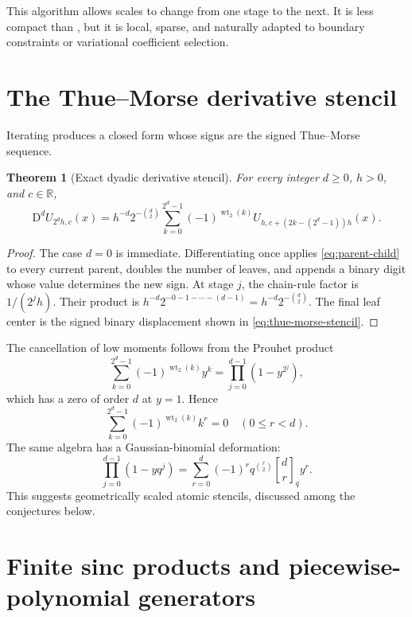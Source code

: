 \documentclass[11pt,oneside]{article}
\newtheorem{theorem}{Theorem}[section]
\theoremstyle{definition}
\theoremstyle{remark}
\newcommand{\R}{\mathbb R}
\newcommand{\wt}{\operatorname{wt}_2}
\newcommand{\D}{\mathrm D}
\newcommand{\qbinom}[3]{\genfrac{[}{]}{0pt}{}{#1}{#2}_{#3}}
\begin{document}
This algorithm allows scales to change from one stage to the next.  It is less
compact than , but it is local, sparse, and naturally adapted to
boundary constraints or variational coefficient selection.

\section{The Thue--Morse derivative stencil}
\label{sec:thue-morse}

Iterating  produces a closed form whose signs are the
signed Thue--Morse sequence.

\begin{theorem}[Exact dyadic derivative stencil]
\label{thm:thue-morse-stencil}
For every integer \(d\ge0\), \(h>0\), and \(c\in\R\),
\begin{equation}
 \boxed{\displaystyle
 \D^dU_{2^dh,c}(x)
 =h^{-d}2^{-\binom d2}
  \sum_{k=0}^{2^d-1}(-1)^{\wt(k)}
  U_{h,c+(2k-(2^d-1))h}(x).}
 \label{eq:thue-morse-stencil}
\end{equation}
\end{theorem}

\begin{proof}
The case \(d=0\) is immediate.  Differentiating once applies
\eqref{eq:parent-child} to every current parent, doubles the number of leaves,
and appends a binary digit whose value determines the new sign.  At stage
\(j\), the chain-rule factor is \(1/(2^jh)\).  Their product is
\(h^{-d}2^{-0-1-\cdots-(d-1)}=h^{-d}2^{-\binom d2}\).  The final leaf center
is the signed binary displacement shown in \eqref{eq:thue-morse-stencil}.
\end{proof}

The cancellation of low moments follows from the Prouhet product
\begin{equation}
 \sum_{k=0}^{2^d-1}(-1)^{\wt(k)}y^k
 =\prod_{j=0}^{d-1}(1-y^{2^j}),
 \label{eq:prouhet-product}
\end{equation}
which has a zero of order \(d\) at \(y=1\).  Hence
\[
 \sum_{k=0}^{2^d-1}(-1)^{\wt(k)}k^r=0
 \quad(0\le r<d).
\]
The same algebra has a Gaussian-binomial deformation:
\begin{equation}
 \prod_{j=0}^{d-1}(1-yq^j)
 =\sum_{r=0}^{d}(-1)^rq^{\binom r2}
   \qbinom{d}{r}{q}y^r.
 \label{eq:q-binomial-product}
\end{equation}
This suggests geometrically scaled atomic stencils, discussed among the
conjectures below.

\section{Finite sinc products and piecewise-polynomial generators}
\label{sec:finite-sinc}
\end{document}
